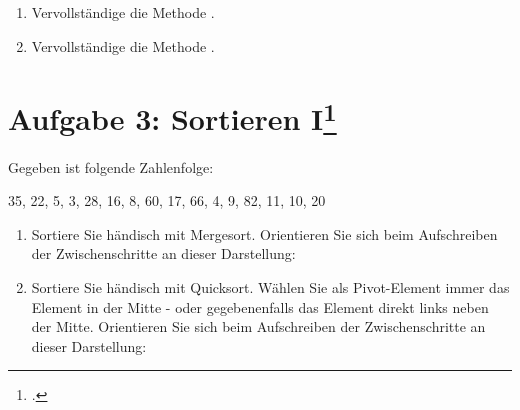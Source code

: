 \documentclass{lehramt-informatik}
\begin{document}
\begin{enumerate}


\item Vervollständige die Methode .

\begin{antwort}
\end{antwort}


\item Vervollständige die Methode .

\begin{antwort}
\end{antwort}
\end{enumerate}

%

\section{Aufgabe 3: Sortieren I\footcite[entnommen aus Algorithmen und
Datenstrukturen, Übungsblatt 2, Universität Würzburg]{aud:pu:7}}

Gegeben ist folgende Zahlenfolge:

35, 22, 5, 3, 28, 16, 8, 60, 17, 66, 4, 9, 82, 11, 10, 20

\begin{enumerate}
\item Sortiere Sie händisch mit Mergesort. Orientieren Sie sich beim
Aufschreiben der Zwischenschritte an dieser Darstellung:

\item Sortiere Sie händisch mit Quicksort. Wählen Sie als Pivot-Element
immer das Element in der Mitte - oder gegebenenfalls das Element direkt
links neben der Mitte. Orientieren Sie sich beim Aufschreiben der
Zwischenschritte an dieser Darstellung:

\end{enumerate}

\literatur
\end{document}
